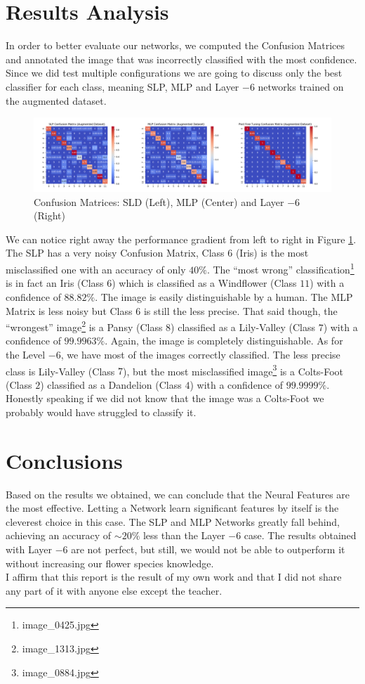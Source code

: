 \documentclass[10pt,a4paper]{report}
\begin{document}
\section{Results Analysis}
In order to better evaluate our networks, we computed the Confusion Matrices and annotated the image that was incorrectly classified with the most confidence. Since we did test multiple configurations we are going to discuss only the best classifier for each class, meaning SLP, MLP and Layer $-6$ networks trained on the augmented dataset. 
\begin{figure}[!ht]
\centering
\includegraphics[width=\linewidth]{conf_mat.png}
\caption{Confusion Matrices: SLD (Left), MLP (Center) and Layer $-6$ (Right)}
\label{fig:confmat}
\end{figure} 
We can notice right away the performance gradient from left to right in Figure \ref{fig:confmat}. The SLP has a very noisy Confusion Matrix, Class $6$ (Iris) is the most misclassified one with an accuracy of only $40 \%$. The \enquote{most wrong} classification\footnote{image\_0425.jpg} is in fact an Iris (Class $6$) which is classified as a Windflower (Class $11$) with a confidence of $88.82 \%$. The image is easily distinguishable by a human. The MLP Matrix is less noisy but Class $6$ is still the less precise. That said though, the \enquote{wrongest} image\footnote{image\_1313.jpg} is a Pansy (Class $8$) classified as a Lily-Valley (Class $7$) with a confidence of $99.9963 \%$. Again, the image is completely distinguishable. As for the Level $-6$, we have most of the images correctly classified. The less precise class is Lily-Valley (Class $7$), but the most misclassified image\footnote{image\_0884.jpg} is a Colts-Foot (Class $2$) classified as a Dandelion (Class $4$) with a confidence of $99.9999 \%$. Honestly speaking if we did not know that the image was a Colts-Foot we probably would have struggled to classify it. 
\section{Conclusions}
Based on the results we obtained, we can conclude that the Neural Features are the most effective. Letting a Network learn significant features by itself is the cleverest choice in this case. The SLP and MLP Networks greatly fall behind, achieving an accuracy of $\sim 20 \%$ less than the Layer $-6$ case. The results obtained with Layer $-6$ are not perfect, but still, we would not be able to outperform it without increasing our flower species knowledge. 
\vspace*{\fill}
\\
I affirm that this report is the result of my own work and that I did not share any part of it with anyone else except the teacher.
\\
\end{document}
